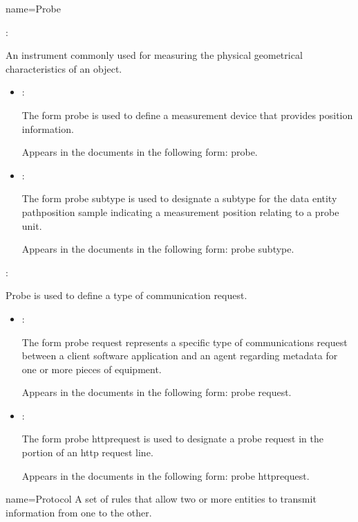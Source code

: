 {
  name={Probe}
}
{
	:

	An instrument commonly used for measuring the physical geometrical characteristics of an object.

    \begin{itemize}
	\item {}:

	The form probe is used to define a measurement device that provides position information.

	Appears in the documents in the following form: probe. 

	\item {}:

	The form \gls{probe subtype} is used to designate a subtype for the \gls{data entity} \gls{pathposition sample} indicating a measurement position relating to a probe unit.

	Appears in the documents in the following form: \gls{probe subtype}.
    \end{itemize}

	:

	Probe is used to define a type of communication request. 

    \begin{itemize}
	\item {}:

	The form \gls{probe request} represents a specific type of communications request between a client software application and an \gls{agent} regarding \gls{metadata} for one or more pieces of equipment.

	Appears in the documents in the following form: \gls{probe request}.

	\item {}:

	The form \gls{probe httprequest} is used to designate a \gls{probe request} in the  portion of an \gls{http request line}.

	Appears in the documents in the following form: \gls{probe httprequest}.
    \end{itemize}
}


{
  name={Protocol}
}
{
	A set of rules that allow two or more entities to transmit information from one to the other.
}


